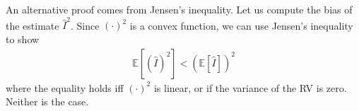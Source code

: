 \begin{enumerate}[label=\alph*.]
An alternative proof comes from Jensen's inequality. Let us compute the bias of the estimate $\hat{I}^2$. Since $(\cdot)^2$ is a convex function, we can use Jensen's inequality to show
\begin{align}
\mathbb{E}\left[(\hat{I})^2\right] < \left(\mathbb{E}\left[\hat{I}\right]\right)^2
\end{align}
where the equality holds iff $(\cdot)^2$ is linear, or if the variance of the RV is zero. Neither is the case.
\end{enumerate}
